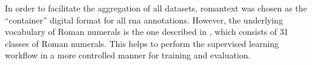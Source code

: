 
In order to facilitate the aggregation of all datasets,
\gls{romantext} was chosen as the ``container'' digital
format for all \gls{rna} annotations. However, the
underlying vocabulary of Roman numerals is the one described
in , which consists of
31 classes of Roman numerals. This helps to perform the
supervised learning workflow in a more controlled manner for
training and evaluation.



